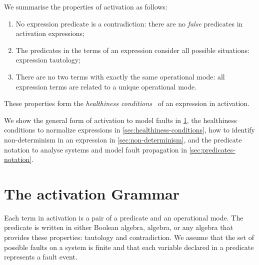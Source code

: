 

\begin{sloppypar}
We summarise the properties of \ac{activation} as follows:
%
\begin{enumerate}
  \item No expression predicate is a contradiction: there are no \emph{false} predicates in activation expressions;
  \item The predicates in the terms of an expression consider all possible situations: expression tautology;
  \item There are no two terms with exactly the same operational mode: all expression terms are related to a unique operational mode.
\end{enumerate}
%
These properties form the \emph{healthiness conditions}~\cite{HH1998} of an expression in \ac{activation}.
\end{sloppypar}

We show the general form of \ac{activation} to model faults in \cref{sec:grammar}, the healthiness conditions to normalize expressions in \cref{sec:healthiness-conditions}, how to identify non-determinism in an expression in \cref{sec:non-determinism}, and the predicate notation to analyse systems and model fault propagation in \cref{sec:predicates-notation}.

\section[The Activation Logic Grammar]{The \acl*{activation} Grammar}
\label{sec:grammar}

Each term in \ac{activation} is a pair of a predicate and an operational mode.
The predicate is written in either Boolean algebra, \ac{algebra}, or any algebra that provides these properties: tautology and contradiction.
We assume that the set of possible faults on a system is finite and that each variable declared in a predicate represents a fault event.

